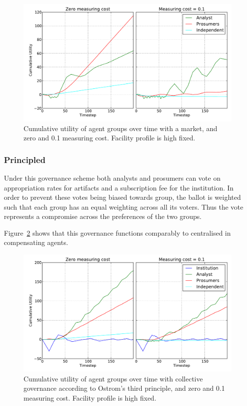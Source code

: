 \begin{figure}
\includegraphics[width=\linewidth]{gfx/kc/market1.pdf} 
\caption{Cumulative utility of agent groups over time with a market, and zero and 0.1 measuring cost. Facility profile is high fixed.}\label{fig:market1}
\end{figure}

\subsubsection{Principled}

Under this governance scheme both analysts and prosumers can vote on appropriation rates for artifacts and a subscription fee for the institution. In order to prevent these votes being biased towards group, the ballot is weighted such that each group has an equal weighting across all its voters. Thus the vote represents a compromise across the preferences of the two groups.

Figure~\ref{fig:principled1} shows that this governance functions comparably to centralised in compensating agents.

\begin{figure}
\includegraphics[width=\linewidth]{gfx/kc/principled.pdf} 
\caption{Cumulative utility of agent groups over time with collective governance according to Ostrom's third principle, and zero and 0.1 measuring cost. Facility profile is high fixed.}\label{fig:principled1}
\end{figure}


